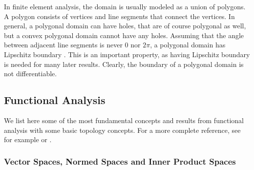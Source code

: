 \documentclass[english, 12pt, a4paper, sci, utf8, a-2b, online]{aaltothesis}
\theoremstyle{definition}
\theoremstyle{plain}
\numberwithin{equation}{section}
\begin{document}
In finite element analysis, the domain is usually modeled as a union of polygons.
A polygon consists of vertices and line segments that connect the vertices.
In general, a polygonal domain can have holes, that are of course polygonal as well,
but a convex polygonal domain cannot have any holes.
Assuming that the angle between adjacent line segments is never $0$ nor $2\pi$,
a polygonal domain has Lipschitz boundary \cite{grisvard2011}.
This is an important property, as having Lipschitz boundary is needed
for many later results.
Clearly, the boundary of a polygonal domain is not differentiable.

\subsection{Functional Analysis}
\label{subsec:functionalanalysis}

We list here some of the most fundamental concepts and results from functional 
analysis with some basic topology concepts.
For a more complete reference, see for example
\cite{rudin1991} or \cite{rudin1986}.

\subsubsection{Vector Spaces, Normed Spaces and Inner Product Spaces}
\label{subsubsec:normedspaces}
\end{document}

